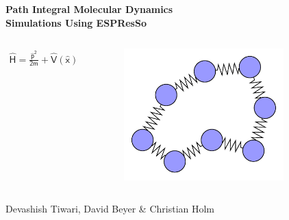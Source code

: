 \documentclass[aspectratio=169, block=fill, handout]{beamer}
\begin{document}
\begin{frame}
\Huge\textbf{\textcolor{blue!40!white}{Path Integral} Molecular Dynamics\\ Simulations Using ESPResSo}
\begin{columns}
\huge
\begin{align*}
	\mathsf{\hat{H} = \frac{\hat{p}^2}{2m} + \hat{V}(\hat{x})}
\end{align*}

\begin{figure}
\centering
\includegraphics[width=0.8\textwidth]{../figures/cg_schematic_neutral/cg_schematic_neutral.pdf}
\end{figure}
\end{columns}
\large
Devashish Tiwari, David Beyer \& Christian Holm
\end{frame}
\end{document}
